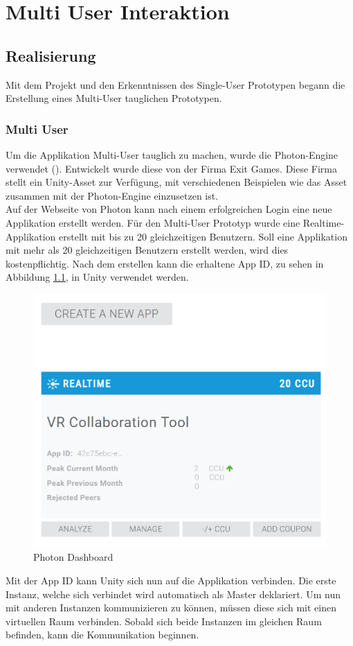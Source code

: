 \chapter{Multi User Interaktion}
\label{ch:Multi_User_Interaktion}

\section{Realisierung}
Mit dem Projekt und den Erkenntnissen des Single-User Prototypen begann die Erstellung eines Multi-User tauglichen Prototypen.

\subsection{Multi User}
\label{ch:multi_user}
Um die Applikation Multi-User tauglich zu machen, wurde die Photon-Engine verwendet (\cite{noauthor_photon_2019}). Entwickelt wurde diese von der Firma Exit Games. Diese Firma stellt ein Unity-Asset zur Verfügung, mit verschiedenen Beispielen wie das Asset zusammen mit der Photon-Engine einzusetzen ist. \\

\noindent Auf der Webseite von Photon kann nach einem erfolgreichen Login eine neue Applikation erstellt werden. Für den Multi-User Prototyp wurde eine Realtime-Applikation erstellt mit bis zu 20 gleichzeitigen Benutzern. Soll eine Applikation mit mehr als 20 gleichzeitigen Benutzern erstellt werden, wird dies kostenpflichtig. Nach dem erstellen kann die erhaltene App ID, zu sehen in Abbildung \ref{fig:photon_dashboard}, in Unity verwendet werden.

\begin{figure}[h!]
	\centering
	\includegraphics[keepaspectratio,width=0.4\linewidth]{img/Photon_Dashboard.PNG}
	\caption{Photon Dashboard}
	\label{fig:photon_dashboard}
\end{figure} 

Mit der App ID kann Unity sich nun auf die Applikation verbinden. Die erste Instanz, welche sich verbindet wird automatisch als Master deklariert. Um nun mit anderen Instanzen kommunizieren zu können, müssen diese sich mit einen virtuellen Raum verbinden. Sobald sich beide Instanzen im gleichen Raum befinden, kann die Kommunikation beginnen.\\

